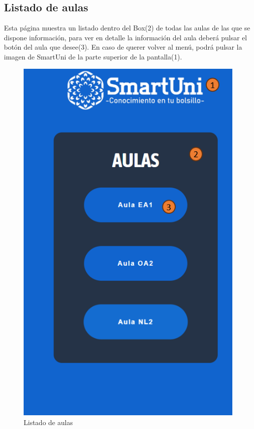 \documentclass[12pt]{report}
\begin{document}
\begin{appendices}
\section{Listado de aulas}
Esta página muestra un listado dentro del Box(2) de todas las aulas de las que se dispone información, para ver en detalle la información del aula deberá pulsar el botón del aula que desee(3). En caso de querer volver al menú, podrá pulsar la imagen de SmartUni de la parte superior de la pantalla(1).\\
\begin{figure}[H]
    \centering
    \includegraphics[scale = 0.7]{imagenes//manual_de_usuario/4.png}
    \caption{Listado de aulas}
    \label{fig:Figura3.4.3}
\end{figure}
\newpage

\end{appendices}
\end{document}
